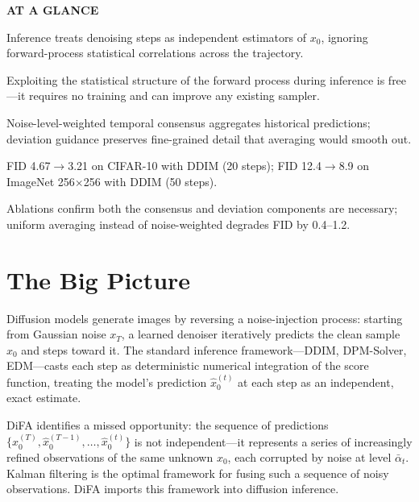 \documentclass[10pt,twocolumn]{article}
\begin{document}
\begin{mdframed}[backgroundcolor=boxgray,linecolor=rulered,linewidth=1pt,
    innerleftmargin=6pt,innerrightmargin=6pt,
    innertopmargin=6pt,innerbottommargin=6pt]
\textbf{\small AT A GLANCE}\par\vspace{4pt}
\begin{description}[leftmargin=0pt,labelsep=4pt,itemsep=2pt,parsep=0pt,
    font=\small\bfseries]
  \item[Problem:] Inference treats denoising steps as independent
    estimators of $x_0$, ignoring forward-process statistical
    correlations across the trajectory.
  \item[Why it matters:] Exploiting the statistical structure of the
    forward process during inference is free---it requires no training
    and can improve any existing sampler.
  \item[Method:] Noise-level-weighted temporal consensus aggregates
    historical predictions; deviation guidance preserves fine-grained
    detail that averaging would smooth out.
  \item[Result:] FID 4.67$\to$3.21 on CIFAR-10 with DDIM (20 steps);
    FID 12.4$\to$8.9 on ImageNet 256$\times$256 with DDIM (50 steps).
  \item[Evidence:] Ablations confirm both the consensus and deviation
    components are necessary; uniform averaging instead of
    noise-weighted degrades FID by 0.4--1.2.
\end{description}
\end{mdframed}

\section{The Big Picture}

Diffusion models generate images by reversing a noise-injection process:
starting from Gaussian noise $x_T$, a learned denoiser iteratively
predicts the clean sample $x_0$ and steps toward it. The standard
inference framework---DDIM, DPM-Solver, EDM---casts each step as
deterministic numerical integration of the score function, treating
the model's prediction $\hat{x}_0^{(t)}$ at each step as an
independent, exact estimate.

DiFA identifies a missed opportunity: the sequence of predictions
$\{\hat{x}_0^{(T)}, \hat{x}_0^{(T-1)}, \ldots, \hat{x}_0^{(t)}\}$
is not independent---it represents a series of increasingly refined
observations of the same unknown $x_0$, each corrupted by noise
at level $\bar\alpha_t$. Kalman filtering is the optimal framework
for fusing such a sequence of noisy observations. DiFA imports this
framework into diffusion inference.
\end{document}
